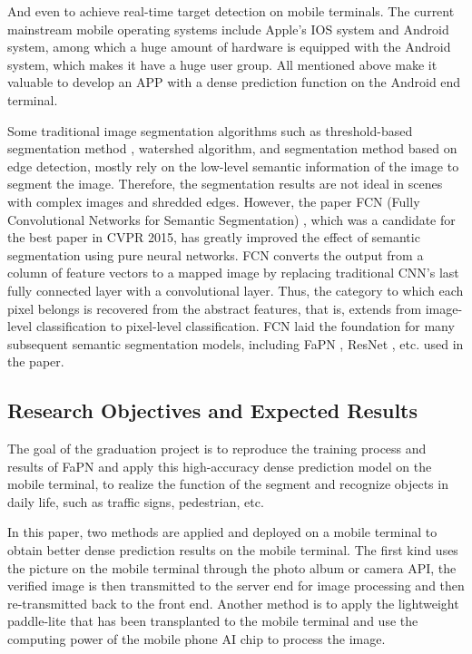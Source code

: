 And even to achieve real-time target detection on mobile terminals. The current mainstream mobile operating systems include Apple's IOS system and Android system, among which a huge amount of hardware is equipped with the Android system, which makes it have a huge user group. All mentioned above make it valuable to develop an APP with a dense prediction function on the Android end terminal.

Some traditional image segmentation algorithms such as threshold-based segmentation method \cite{al2010image}, watershed algorithm, and segmentation method based on edge detection, mostly rely on the low-level semantic information of the image to segment the image. Therefore, the segmentation results are not ideal in scenes with complex images and shredded edges. However, the paper FCN (Fully Convolutional Networks for Semantic Segmentation) \cite{long2015fully}, which was a candidate for the best paper in CVPR 2015, has greatly improved the effect of semantic segmentation using pure neural networks. FCN converts the output from a column of feature vectors to a mapped image by replacing traditional CNN's last fully connected layer with a convolutional layer. Thus, the category to which each pixel belongs is recovered from the abstract features, that is, extends from image-level classification to pixel-level classification. FCN laid the foundation for many subsequent semantic segmentation models, including FaPN \cite{huang2021fapn}, ResNet \cite{he2016deep}, etc. used in the paper.


\subsection{Research Objectives and Expected Results}
The goal of the graduation project is to reproduce the training process and results of FaPN \cite{huang2021fapn} and apply this high-accuracy dense prediction model on the mobile terminal, to realize the function of the segment and recognize objects in daily life, such as traffic signs, pedestrian, etc.

In this paper, two methods are applied and deployed on a mobile terminal to obtain better dense prediction results on the mobile terminal. The first kind uses the picture on the mobile terminal through the photo album or camera API, the verified image is then transmitted to the server end for image processing and then re-transmitted back to the front end. Another method is to apply the lightweight paddle-lite \cite{paddlelite} that has been transplanted to the mobile terminal and use the computing power of the mobile phone AI chip to process the image.

